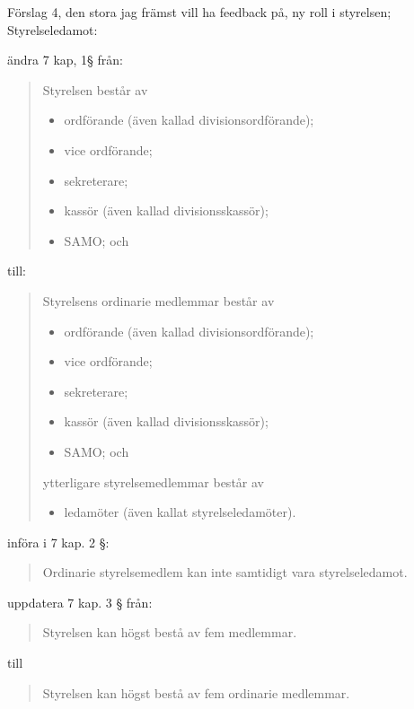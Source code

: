 \documentclass[protokoll]{dvd}
\begin{document}
Förslag 4, den stora jag främst vill ha feedback på, ny roll i styrelsen; Styrelseledamot:
\begin{attsatser}
    \item ändra 7 kap, 1§ från:
    \begin{quote}
    Styrelsen består av
		\begin{itemize}
			\item ordförande (även kallad divisionsordförande);
			\item vice ordförande;
			\item sekreterare;
			\item kassör (även kallad divisionsskassör);
			\item SAMO; och
            \end{itemize}
    \end{quote}
    till:
    \begin{quote}
        Styrelsens ordinarie medlemmar består av 
		\begin{itemize}
			\item ordförande (även kallad divisionsordförande);
			\item vice ordförande;
			\item sekreterare;
			\item kassör (även kallad divisionsskassör);
			\item SAMO; och
            \end{itemize}
            ytterligare styrelsemedlemmar består av
            \begin{itemize}
                \item ledamöter (även kallat    styrelseledamöter).
            \end{itemize}
    \end{quote}
    
    \item införa i 7 kap. 2 §:
    \begin{quote}
        Ordinarie styrelsemedlem kan inte samtidigt vara styrelseledamot.
    \end{quote}
    
    \item uppdatera 7 kap. 3 § från:
    \begin{quote}
        Styrelsen kan högst bestå av fem medlemmar.
    \end{quote}
    till 
    \begin{quote}
        Styrelsen kan högst bestå av fem ordinarie medlemmar. 
    \end{quote}
    

\end{attsatser}
\end{document}
